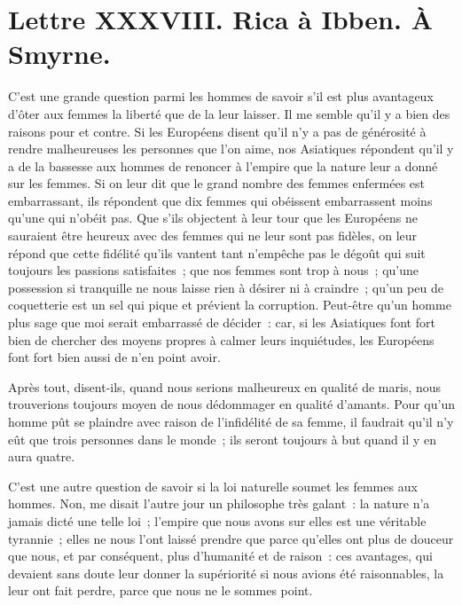 \documentclass[french,twoside]{book} %
\newcommand{\dateline}[1]{\medskip{\RaggedLeft{#1}\par}\bigskip}
\begin{document}
\dateline{À Paris, le 7 de la lune de Maharran, 1713.}
\section[{Lettre XXXVIII. Rica à Ibben. À Smyrne.}]{Lettre XXXVIII. Rica à Ibben. À Smyrne.}\renewcommand{\leftmark}{Lettre XXXVIII. Rica à Ibben. À Smyrne.}

\noindent C’est une grande question parmi les hommes de savoir s’il est plus avantageux d’ôter aux femmes la liberté que de la leur laisser. Il me semble qu’il y a bien des raisons pour et contre. Si les Européens disent qu’il n’y a pas de générosité à rendre malheureuses les personnes que l’on aime, nos Asiatiques répondent qu’il y a de la bassesse aux hommes de renoncer à l’empire que la nature leur a donné sur les femmes. Si on leur dit que le grand nombre des femmes enfermées est embarrassant, ils répondent que dix femmes qui obéissent embarrassent moins qu’une qui n’obéit pas. Que s’ils objectent à leur tour que les Européens ne sauraient être heureux avec des femmes qui ne leur sont pas fidèles, on leur répond que cette fidélité qu’ils vantent tant n’empêche pas le dégoût qui suit toujours les passions satisfaites ; que nos femmes sont trop à nous ; qu’une possession si tranquille ne nous laisse rien à désirer ni à craindre ; qu’un peu de coquetterie est un sel qui pique et prévient la corruption. Peut-être qu’un homme plus sage que moi serait embarrassé de décider : car, si les Asiatiques font fort bien de chercher des moyens propres à calmer leurs inquiétudes, les Européens font fort bien aussi de n’en point avoir.\par
Après tout, disent-ils, quand nous serions malheureux en qualité de maris, nous trouverions toujours moyen de nous dédommager en qualité d’amants. Pour qu’un homme pût se plaindre avec raison de l’infidélité de sa femme, il faudrait qu’il n’y eût que trois personnes dans le monde ; ils seront toujours à but quand il y en aura quatre.\par
C’est une autre question de savoir si la loi naturelle soumet les femmes aux hommes. Non, me disait l’autre jour un philosophe très galant : la nature n’a jamais dicté une telle loi ; l’empire que nous avons sur elles est une véritable tyrannie ; elles ne nous l’ont laissé prendre que parce qu’elles ont plus de douceur que nous, et par conséquent, plus d’humanité et de raison : ces avantages, qui devaient sans doute leur donner la supériorité si nous avions été raisonnables, la leur ont fait perdre, parce que nous ne le sommes point.\par
\end{document}
